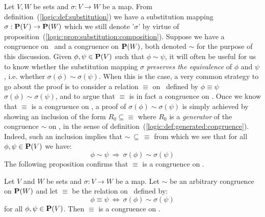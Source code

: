 Let $V,W$ be sets and $\sigma:V\to W$ be a map. From
definition~(\ref{logic:def:substitution}) we have a substitution
mapping $\sigma:\mbox{${\bf P}(V)$}\to{\bf P}(W)$ which we still denote '$\sigma$'
by virtue of
proposition~(\ref{logic:prop:substitution:composition}). Suppose we
have a congruence on \pv\ and a congruence on ${\bf P}(W)$, both
denoted $\sim$ for the purpose of this discussion. Given
$\phi,\psi\in\mbox{${\bf P}(V)$}$ such that $\phi\sim\psi$, it will often be useful
for us to know whether the substitution mapping $\sigma$ {\em
preserves the equivalence} of $\phi$ and $\psi$, i.e. whether
$\sigma(\phi)\sim\sigma(\psi)$. When this is the case, a very common
strategy to go about the proof is to consider a relation $\equiv$ on
\pv\ defined by $\phi\equiv\psi$ \ifand\
$\sigma(\phi)\sim\sigma(\psi)$, and to argue that $\equiv$ is in
fact a congruence on \pv. Once we know that $\equiv$ is a congruence
on \pv, a proof of $\sigma(\phi)\sim\sigma(\psi)$ is simply achieved
by showing an inclusion of the form $R_{0}\subseteq\equiv$ where
$R_{0}$ is a {\em generator} of the congruence $\sim$ on \pv, in the
sense of definition~(\ref{logic:def:generated:congruence}). Indeed,
such an inclusion implies that $\sim\,\subseteq\,\equiv$ from which
we see that for all $\phi,\psi\in\mbox{${\bf P}(V)$}$ we have:
    \[
    \phi\sim\psi\ \Rightarrow\ \sigma(\phi)\sim\sigma(\psi)
    \]
The following proposition confirms that $\equiv$ is a congruence on
\pv.
\begin{prop}\label{logic:prop:substitution:congruence}
Let $V$ and $W$ be sets and $\sigma:V\to W$ be a map. Let $\sim$ be
an arbitrary congruence on ${\bf P}(W)$ and let $\equiv$ be the
relation on \pv\ defined by:
    \[
    \phi\equiv\psi\ \Leftrightarrow\ \sigma(\phi)\sim\sigma(\psi)
    \]
for all $\phi,\psi\in\mbox{${\bf P}(V)$}$. Then $\equiv$ is a congruence on \pv.
\end{prop}
